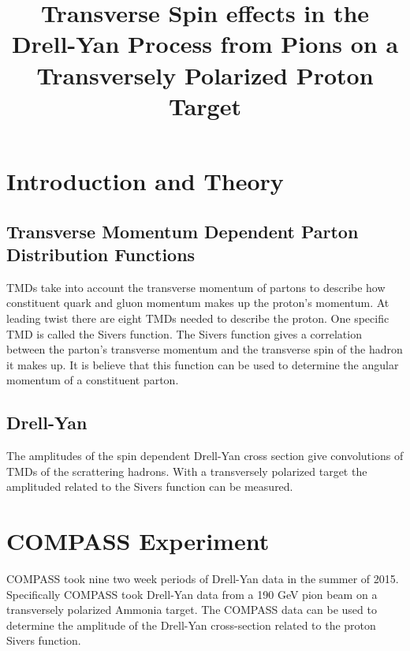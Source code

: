 \documentclass{article}
\title{Transverse Spin effects in the Drell-Yan Process from Pions on a
  Transversely Polarized Proton Target}
\date{}
\begin{document}
\maketitle

\section{Introduction and Theory}	%

\subsection{Transverse Momentum Dependent Parton Distribution Functions}
TMDs take into account the transverse momentum of partons to describe
how constituent quark and gluon momentum makes up the proton's
momentum.  At leading twist there are eight TMDs needed to describe
the proton.  One specific TMD is called the Sivers function.  The
Sivers function gives a correlation between the parton's transverse
momentum and the transverse spin of the hadron it makes up.  It is
believe that this function can be used to determine the angular
momentum of a constituent parton.

\subsection{Drell-Yan}
The amplitudes of the spin dependent Drell-Yan cross section give
convolutions of TMDs of the scrattering hadrons.  With a transversely
polarized target the amplituded related to the Sivers function can be
measured.

\section{COMPASS Experiment}
COMPASS took nine two week periods of Drell-Yan data in the summer of
2015.  Specifically COMPASS took Drell-Yan data from a 190 GeV pion
beam on a transversely polarized Ammonia target.  The COMPASS data can
be used to determine the amplitude of the Drell-Yan cross-section
related to the proton Sivers function.
\end{document}
